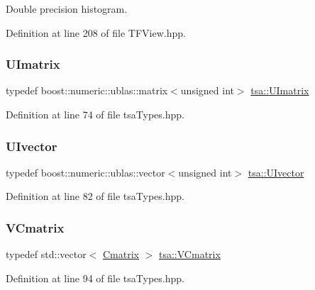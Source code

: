 Double precision histogram. 



Definition at line 208 of file T\+F\+View.\+hpp.

\mbox{\label{namespacetsa_ad9cc6c0ebe447f2d49102804a7d7a6f6}} 
\subsubsection{\texorpdfstring{U\+Imatrix}{UImatrix}}
{\footnotesize\ttfamily typedef boost\+::numeric\+::ublas\+::matrix$<$unsigned int$>$ \hyperlink{namespacetsa_ad9cc6c0ebe447f2d49102804a7d7a6f6}{tsa\+::\+U\+Imatrix}}



Definition at line 74 of file tsa\+Types.\+hpp.

\mbox{\label{namespacetsa_abed2840bd46d70e5aa1122cf7d06a6ed}} 
\subsubsection{\texorpdfstring{U\+Ivector}{UIvector}}
{\footnotesize\ttfamily typedef boost\+::numeric\+::ublas\+::vector$<$unsigned int$>$ \hyperlink{namespacetsa_abed2840bd46d70e5aa1122cf7d06a6ed}{tsa\+::\+U\+Ivector}}



Definition at line 82 of file tsa\+Types.\+hpp.

\mbox{\label{namespacetsa_a58da96b64dcaa37bc6d90a20f38220c9}} 
\subsubsection{\texorpdfstring{V\+Cmatrix}{VCmatrix}}
{\footnotesize\ttfamily typedef std\+::vector$<$ \hyperlink{namespacetsa_a86348fef1603a135fe5fba9e5f5486ee}{Cmatrix} $>$ \hyperlink{namespacetsa_a58da96b64dcaa37bc6d90a20f38220c9}{tsa\+::\+V\+Cmatrix}}



Definition at line 94 of file tsa\+Types.\+hpp.

\mbox{\label{namespacetsa_a6dd7105c3202ef00a213d7c029f5b248}} 
